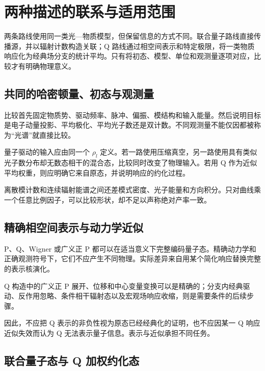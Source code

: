 \documentclass[UTF8,a4paper,zihao=-4,openany,fontset=fandol]{ctexbook}
\begin{document}
\chapter{两种描述的联系与适用范围}\label{ch:14}


两条路线使用同一类光—物质模型，但保留信息的方式不同。联合量子路线直接传播源，并以辐射计数构造关联；Q 路线通过相空间表示和特定极限，将一类物质响应化为经典场分支的统计平均。只有将初态、模型、单位和观测量逐项对应，比较才有明确物理意义。



\section{共同的哈密顿量、初态与观测量}\label{sec:14:1}


比较首先固定物质势、驱动频率、脉冲、偏振、模结构和输入能量。然后说明目标是电子动量投影、平均极化、平均光子数还是双计数。不同观测量不能仅因都被称为“光谱”就直接比较。



量子驱动的输入应由同一个 $\rho_l$ 定义。若一路使用压缩真空，另一路使用具有类似光子数分布却无数态相干的混合态，比较同时改变了物理输入。若用 Q 作为近似平均权重，则应明确它来自原态，并说明响应的约化过程。



离散模计数和连续辐射能谱之间还差模式密度、光子能量和方向积分。只对曲线乘一个任意比例因子，可以比较形状，却不足以声称绝对产率一致。



\section{精确相空间表示与动力学近似}\label{sec:14:2}


P、Q、Wigner 或广义正 P 都可以在适当意义下完整编码量子态。精确动力学和正确观测符号下，它们不应产生不同物理。实际差异来自用某个简化响应替换完整的表示核演化。



Q 构造中的广义正 P 展开、位移和中心变量变换可以是精确的；分支内经典驱动、反作用忽略、条件相干辐射态以及宏观场响应收缩，则是需要条件的后续步骤。



因此，不应把 Q 表示的非负性视为原态已经经典化的证明，也不应因某一 Q 响应近似失效而认为 Q 无法表示量子信息。表示与近似承担不同任务。



\section{联合量子态与 Q 加权约化态}\label{sec:14:3}
\end{document}
